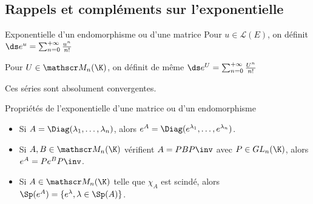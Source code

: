 \subsection{Rappels et compléments sur l'exponentielle}

\begin{definition}{Exponentielle d'un endomorphisme ou d'une matrice}{}
    Pour $u \in \mathscr L(E)$, on définit $\ds e^u = \sum_{n = 0}^{+ \infty} \frac{u^n}{n!}$

    Pour $U \in \mathscr M_n(\K)$, on définit de même $\ds e^U = \sum_{n = 0}^{+ \infty} \frac{U^n}{n!}$
    
    Ces séries sont absolument convergentes. 
\end{definition}

\begin{propositionnt}{Propriétés de l'exponentielle d'une matrice ou d'un endomorphisme}{}
    \begin{itemize}
        \item  Si $A = \Diag (\lambda_1, \dots, \lambda_n)$, alors $e^A = \Diag (e^{\lambda_1}, \dots, e^{\lambda_n})$.
        \item Si $A, B \in \mathscr M_n(\K)$ vérifient $A = PBP\inv$ avec $P \in GL_n(\K)$, alors $e^A = P e^B P\inv$.
        \item Si $A \in \mathscr M_n(\K)$ telle que $\chi_A$ est scindé, alors 
        $\Sp(e^A) = \{e^\lambda, \lambda \in \Sp(A)\}$. 
    \end{itemize}
\end{propositionnt}

